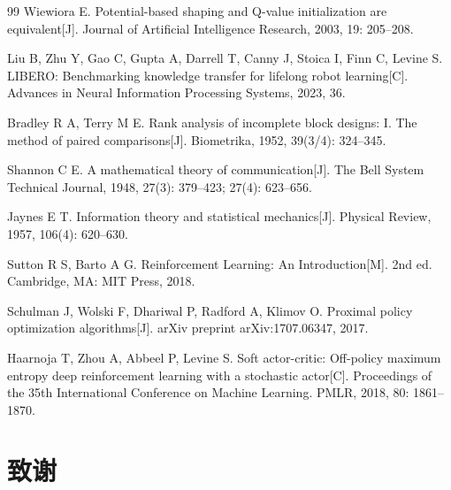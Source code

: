 \begin{thebibliography}{99}
Wiewiora E.
Potential-based shaping and Q-value initialization are equivalent[J].
Journal of Artificial Intelligence Research, 2003, 19: 205--208.

Liu B, Zhu Y, Gao C, Gupta A, Darrell T, Canny J, Stoica I, Finn C, Levine S.
LIBERO: Benchmarking knowledge transfer for lifelong robot learning[C].
Advances in Neural Information Processing Systems, 2023, 36.

Bradley R A, Terry M E.
Rank analysis of incomplete block designs: I. The method of paired comparisons[J].
Biometrika, 1952, 39(3/4): 324--345.

Shannon C E.
A mathematical theory of communication[J].
The Bell System Technical Journal, 1948, 27(3): 379--423; 27(4): 623--656.

Jaynes E T.
Information theory and statistical mechanics[J].
Physical Review, 1957, 106(4): 620--630.

Sutton R S, Barto A G.
Reinforcement Learning: An Introduction[M].
2nd ed. Cambridge, MA: MIT Press, 2018.

Schulman J, Wolski F, Dhariwal P, Radford A, Klimov O.
Proximal policy optimization algorithms[J].
arXiv preprint arXiv:1707.06347, 2017.

Haarnoja T, Zhou A, Abbeel P, Levine S.
Soft actor-critic: Off-policy maximum entropy deep reinforcement learning with a stochastic actor[C].
Proceedings of the 35th International Conference on Machine Learning. PMLR, 2018, 80: 1861--1870.

\end{thebibliography}



\clearpage
\section*{致谢}



